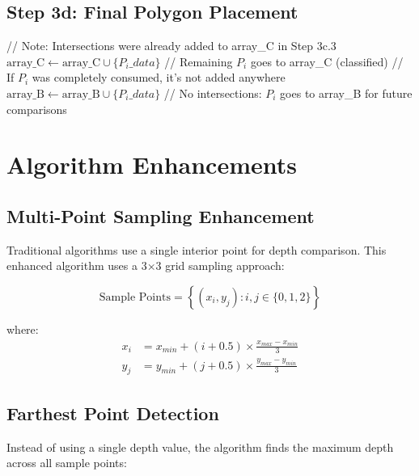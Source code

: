 \documentclass[12pt,a4paper]{article}
\begin{document}
\subsection{Step 3d: Final Polygon Placement}

\begin{algorithm}
\caption{Final Polygon Placement}
\begin{algorithmic}[1]
\STATE // Note: Intersections were already added to array\_C in Step 3c.3
        \STATE $\text{array\_C} \leftarrow \text{array\_C} \cup \{P_i\_data\}$
        \STATE // Remaining $P_i$ goes to array\_C (classified)
    \ENDIF
    \STATE // If $P_i$ was completely consumed, it's not added anywhere
\ELSE
    \STATE $\text{array\_B} \leftarrow \text{array\_B} \cup \{P_i\_data\}$
    \STATE // No intersections: $P_i$ goes to array\_B for future comparisons
\ENDIF
\ENDWHILE
\end{algorithmic}
\end{algorithm}

\section{Algorithm Enhancements}

\subsection{Multi-Point Sampling Enhancement}

Traditional algorithms use a single interior point for depth comparison. This enhanced algorithm uses a 3×3 grid sampling approach:

\begin{equation}
\text{Sample Points} = \left\{(x_i, y_j) : i,j \in \{0,1,2\}\right\}
\end{equation}

where:
\begin{align}
x_i &= x_{min} + (i + 0.5) \times \frac{x_{max} - x_{min}}{3} \\
y_j &= y_{min} + (j + 0.5) \times \frac{y_{max} - y_{min}}{3}
\end{align}

\subsection{Farthest Point Detection}

Instead of using a single depth value, the algorithm finds the maximum depth across all sample points:
\end{document}
